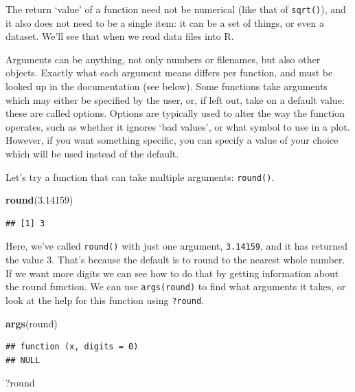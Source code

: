 \documentclass[
]{book}
\newenvironment{Shaded}{\begin{snugshade}}{\end{snugshade}}
\newcommand{\FloatTok}[1]{\textcolor[rgb]{0.00,0.00,0.81}{#1}}
\newcommand{\FunctionTok}[1]{\textcolor[rgb]{0.13,0.29,0.53}{\textbf{#1}}}
\newcommand{\NormalTok}[1]{#1}
\begin{document}
The return `value' of a function need not be numerical (like that of \texttt{sqrt()}), and it also does not need to be a single item: it can be a set of things, or even a dataset. We'll see that when we read data files into R.

Arguments can be anything, not only numbers or filenames, but also other objects. Exactly what each argument means differs per function, and must be looked up in the documentation (see below). Some functions take arguments which may either be specified by the user, or, if left out, take on a default value: these are called options. Options are typically used to alter the way the function operates, such as whether it ignores `bad values', or what symbol to use in a plot. However, if you want something specific, you can specify a value of your choice which will be used instead of the default.

Let's try a function that can take multiple arguments: \texttt{round()}.

\begin{Shaded}
\begin{Highlighting}[]
\FunctionTok{round}\NormalTok{(}\FloatTok{3.14159}\NormalTok{)}
\end{Highlighting}
\end{Shaded}

\begin{verbatim}
## [1] 3
\end{verbatim}

Here, we've called \texttt{round()} with just one argument, \texttt{3.14159}, and it has returned the value 3. That's because the default is to round to the nearest whole number. If we want more digits we can see how to do that by getting information about the round function. We can use \texttt{args(round)} to find what arguments it takes, or look at the help for this function using \texttt{?round}.

\begin{Shaded}
\begin{Highlighting}[]
\FunctionTok{args}\NormalTok{(round)}
\end{Highlighting}
\end{Shaded}

\begin{verbatim}
## function (x, digits = 0) 
## NULL
\end{verbatim}

\begin{Shaded}
\begin{Highlighting}[]
\NormalTok{?round}
\end{Highlighting}
\end{Shaded}
\end{document}
